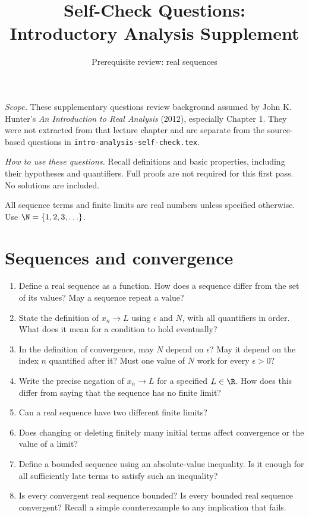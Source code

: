 \documentclass{self-check}
\title{Self-Check Questions:\\Introductory Analysis Supplement}
\subtitle{Prerequisite review: real sequences}
\author{}
\date{}
\begin{document}
\maketitle

\textit{Scope.} These supplementary questions review background assumed by
John K. Hunter's \textit{An Introduction to Real Analysis} (2012), especially
Chapter 1. They were not extracted from that lecture chapter and are separate
from the source-based questions in \texttt{intro-analysis-self-check.tex}.

\textit{How to use these questions.} Recall definitions and basic properties,
including their hypotheses and quantifiers. Full proofs are not required for
this first pass. No solutions are included.

All sequence terms and finite limits are real numbers unless specified
otherwise. Use \(\N=\{1,2,3,\ldots\}\).

\section{Sequences and convergence}
\begin{enumerate}
  \item Define a real sequence as a function. How does a sequence differ
    from the set of its values? May a sequence repeat a value?

  \item State the definition of \(x_n\to L\) using \(\epsilon\) and
    \(N\), with all quantifiers in order.
    What does it mean for a condition to hold eventually?

  \item In the definition of convergence, may \(N\) depend on
    \(\epsilon\)? May it depend on the index \(n\) quantified after it?
    Must one value of \(N\) work for every \(\epsilon>0\)?

  \item Write the precise negation of \(x_n\to L\) for a specified
    \(L\in\R\). How does this differ from saying that the sequence
    has no finite limit?

  \item Can a real sequence have two different finite limits?

  \item Does changing or deleting finitely many initial terms affect
    convergence or the value of a limit?

  \item Define a bounded sequence using an absolute-value inequality.
    Is it enough for all sufficiently late terms to satisfy such an
    inequality?

  \item Is every convergent real sequence bounded? Is every bounded
    real sequence convergent? Recall a simple counterexample to any
    implication that fails.
\end{enumerate}
\end{document}
